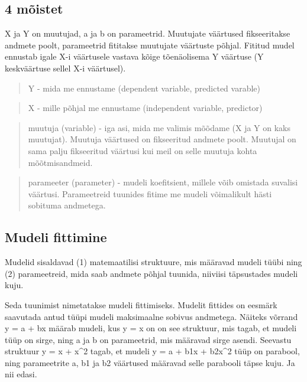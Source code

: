 \documentclass[]{book}
\begin{document}
\subsection{4 mõistet}\label{moistet}

X ja Y on muutujad, a ja b on parameetrid. Muutujate väärtused
fikseeritakse andmete poolt, parameetrid fititakse muutujate väärtuste
põhjal. Fititud mudel ennustab igale X-i väärtusele vastava kõige
tõenäolisema Y väärtuse (Y keskväärtuse sellel X-i väärtusel).

\begin{quote}
Y - mida me ennustame (dependent variable, predicted varable)
\end{quote}

\begin{quote}
X - mille põhjal me ennustame (independent variable, predictor)
\end{quote}

\begin{quote}
muutuja (variable) - iga asi, mida me valimis mõõdame (X ja Y on kaks
muutujat). Muutuja väärtused on fikseeritud andmete poolt. Muutujal on
sama palju fikseeritud väärtusi kui meil on selle muutuja kohta
mõõtmisandmeid.
\end{quote}

\begin{quote}
parameeter (parameter) - mudeli koefitsient, millele võib omistada
suvalisi väärtusi. Parameetreid tuunides fitime me mudeli võimalikult
hästi sobituma andmetega.
\end{quote}

\subsection{Mudeli fittimine}\label{mudeli-fittimine}

Mudelid sisaldavad (1) matemaatilisi struktuure, mis määravad mudeli
tüübi ning (2) parameetreid, mida saab andmete põhjal tuunida, niiviisi
täpsustades mudeli kuju.

Seda tuunimist nimetatakse mudeli fittimiseks. Mudelit fittides on
eesmärk saavutada antud tüüpi mudeli maksimaalne sobivus andmetega.
Näiteks võrrand y = a + bx määrab mudeli, kus y = x on on see struktuur,
mis tagab, et mudeli tüüp on sirge, ning a ja b on parameetrid, mis
määravad sirge asendi. Seevastu struktuur y = x + x\^{}2 tagab, et
mudeli y = a + b1x + b2x\^{}2 tüüp on parabool, ning parameetrite a, b1
ja b2 väärtused määravad selle parabooli täpse kuju. Ja nii edasi.
\end{document}
